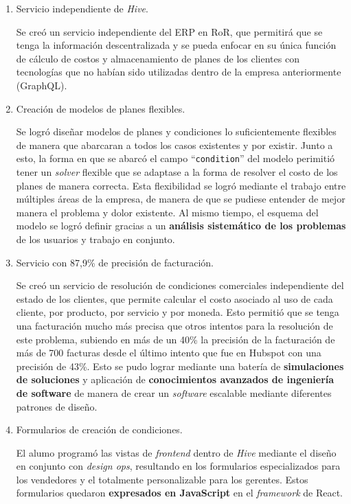   \begin{enumerate}
    \item Servicio independiente de \textit{Hive}.
    
    Se creó un servicio independiente del ERP en RoR, que permitirá que se tenga la información descentralizada y se pueda enfocar en su única función de cálculo de costos y almacenamiento de planes de los clientes con tecnologías que no habían sido utilizadas dentro de la empresa anteriormente (GraphQL).

    \item Creación de modelos de planes flexibles.

    Se logró diseñar modelos de planes y condiciones lo suficientemente flexibles de manera que abarcaran a todos los casos existentes y por existir. Junto a esto, la forma en que se abarcó el campo ``\texttt{condition}'' del modelo perimitió tener un \textit{solver} flexible que se adaptase a la forma de resolver el costo de los planes de manera correcta. Esta flexibilidad se logró mediante el trabajo entre múltiples áreas de la empresa, de manera de que se pudiese entender de mejor manera el problema y dolor existente. Al mismo tiempo, el esquema del modelo se logró definir gracias a un \textbf{análisis sistemático de los problemas} de los usuarios y trabajo en conjunto.

    \item Servicio con 87,9\% de precisión de facturación.
    
    Se creó un servicio de resolución de condiciones comerciales independiente del estado de los clientes, que permite calcular el costo asociado al uso de cada cliente, por producto, por servicio y por moneda. Esto permitió que se tenga una facturación mucho más precisa que otros intentos para la resolución de este problema, subiendo en más de un 40\% la precisión de la facturación de más de 700 facturas desde el último intento que fue en Hubspot con una precisión de 43\%. Esto se pudo lograr mediante una batería de \textbf{simulaciones de soluciones} y aplicación de \textbf{conocimientos avanzados de ingeniería de software} de manera de crear un \textit{software} escalable mediante diferentes patrones de diseño.

    \item Formularios de creación de condiciones.

    El alumo programó las vistas de \textit{frontend} dentro de \textit{Hive} mediante el diseño en conjunto con \textit{design ops}, resultando en los formularios especializados para los vendedores y el totalmente personalizable para los gerentes. Estos formularios quedaron \textbf{expresados en JavaScript} en el \textit{framework} de React.
    

\end{enumerate}

